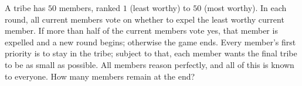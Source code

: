 A tribe has $50$ members, ranked $1$ (least worthy) to $50$ (most worthy). In each round, all current members vote on whether to expel the least worthy current member. If more than half of the current members vote yes, that member is expelled and a new round begins; otherwise the game ends. Every member's first priority is to stay in the tribe; subject to that, each member wants the final tribe to be as small as possible. All members reason perfectly, and all of this is known to everyone. How many members remain at the end?
